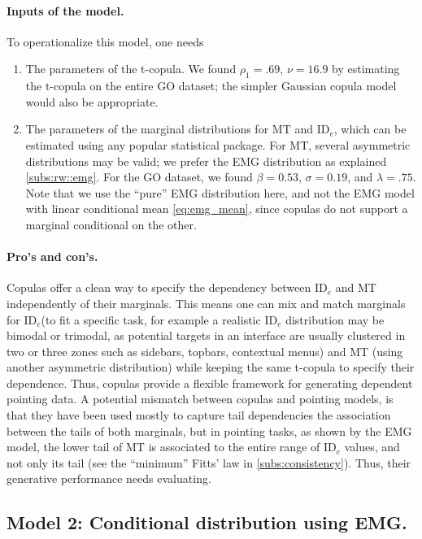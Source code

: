 \documentclass[acmlarge, manuscript,review]{acmart}
\newcommand{\ide}{\ensuremath{{\text{ID}_e}}\xspace}
\begin{document}
\paragraph{Inputs of the model.} To operationalize this model, one needs
\begin{enumerate}
  \item The parameters of the t-copula. We found $\rho_1 = .69$, $\nu = 16.9$ by estimating the t-copula on the entire GO dataset; the simpler Gaussian copula model would also be appropriate.
  \item The parameters of the marginal distributions for MT and \ide, which can be estimated using any popular statistical package. For MT, several asymmetric distributions may be valid; we prefer the EMG distribution as explained \autoref{subs:rw::emg}. For the GO dataset, we found $\beta = 0.53$, $\sigma = 0.19$, and $\lambda= .75$. Note that we use the ``pure'' EMG distribution here, and not the EMG model with linear conditional mean \autoref{eq:emg_mean}, since copulas do not support a marginal conditional on the other.
\end{enumerate}

\paragraph{Pro's and con's.} Copulas offer a clean way to specify the dependency between \ide and MT independently of their marginals. This means one can mix and match marginals for \ide (\eg to fit a specific task, for example a realistic \ide distribution may be bimodal or trimodal, as potential targets in an interface are usually clustered in two or three zones such as sidebars, topbars, contextual menus) and MT (\eg using another asymmetric distribution) while keeping the same t-copula to specify their dependence. Thus, copulas provide a flexible framework for generating dependent pointing data.
A potential mismatch between copulas and pointing models, is that they have been used mostly to capture tail dependencies \ie the association between the tails of both marginals, but in pointing tasks, as shown by the EMG model, the lower tail of MT is associated to the entire range of \ide values, and not only its tail (see the ``minimum'' Fitts' law in \autoref{subs:consistency}). Thus, their generative performance needs evaluating.

\subsection{Model 2: Conditional distribution using EMG.}
\end{document}
